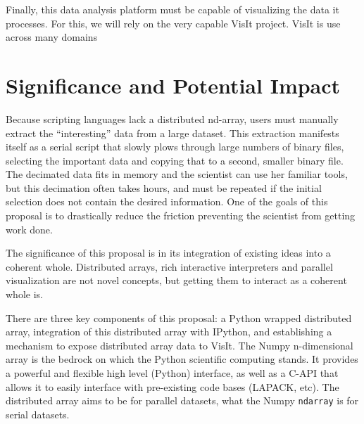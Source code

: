 \documentclass[letterpaper,11pt]{article}
\begin{document}
Finally, this data analysis platform must be capable of visualizing the data it processes.  For this, we will rely on the very capable VisIt project.  VisIt is use across many domains






\section*{Significance and Potential Impact}

Because scripting languages lack a distributed nd-array, users must manually extract the ``interesting'' data from a large dataset.  This extraction manifests itself as a serial script that slowly plows through large numbers of binary files, selecting the important data and copying that to a second, smaller binary file.  The decimated data fits in memory and the scientist can use her familiar tools, but this decimation often takes hours, and must be repeated if the initial selection does not contain the desired information.  One of the goals of this proposal is to drastically reduce the friction preventing the scientist from getting work done.


The significance of this proposal is in its integration of existing ideas into a coherent whole.  Distributed arrays, rich interactive interpreters and parallel visualization are not novel concepts, but getting them to interact as a coherent whole is.

There are three key components of this proposal: a Python wrapped distributed array, integration of this distributed array with IPython, and establishing a mechanism to expose distributed array data to VisIt.  The Numpy n-dimensional array is the bedrock on which the Python scientific computing stands.  It provides a powerful and flexible high level (Python) interface, as well as a C-API that allows it to easily interface with pre-existing code bases (LAPACK, etc).  The distributed array aims to be for parallel datasets, what the Numpy \texttt{ndarray} is for serial datasets.
\end{document}
